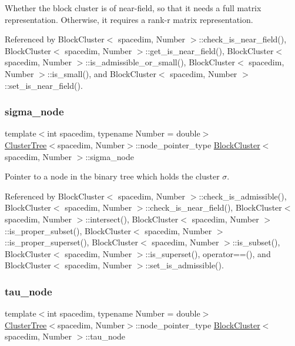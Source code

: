 Whether the block cluster is of near-\/field, so that it needs a full matrix representation. Otherwise, it requires a rank-\/r matrix representation. 

Referenced by Block\+Cluster$<$ spacedim, Number $>$\+::check\+\_\+is\+\_\+near\+\_\+field(), Block\+Cluster$<$ spacedim, Number $>$\+::get\+\_\+is\+\_\+near\+\_\+field(), Block\+Cluster$<$ spacedim, Number $>$\+::is\+\_\+admissible\+\_\+or\+\_\+small(), Block\+Cluster$<$ spacedim, Number $>$\+::is\+\_\+small(), and Block\+Cluster$<$ spacedim, Number $>$\+::set\+\_\+is\+\_\+near\+\_\+field().

\mbox{\label{classBlockCluster_ae1005ec7feedbdb990b27d845b24bad2}} 
\subsubsection{\texorpdfstring{sigma\+\_\+node}{sigma\_node}}
{\footnotesize\ttfamily template$<$int spacedim, typename Number = double$>$ \\
\hyperlink{classClusterTree}{Cluster\+Tree}$<$spacedim, Number$>$\+::node\+\_\+pointer\+\_\+type \hyperlink{classBlockCluster}{Block\+Cluster}$<$ spacedim, Number $>$\+::sigma\+\_\+node\hspace{0.3cm}{\ttfamily [private]}}

Pointer to a node in the binary tree which holds the cluster $\sigma$. 

Referenced by Block\+Cluster$<$ spacedim, Number $>$\+::check\+\_\+is\+\_\+admissible(), Block\+Cluster$<$ spacedim, Number $>$\+::check\+\_\+is\+\_\+near\+\_\+field(), Block\+Cluster$<$ spacedim, Number $>$\+::intersect(), Block\+Cluster$<$ spacedim, Number $>$\+::is\+\_\+proper\+\_\+subset(), Block\+Cluster$<$ spacedim, Number $>$\+::is\+\_\+proper\+\_\+superset(), Block\+Cluster$<$ spacedim, Number $>$\+::is\+\_\+subset(), Block\+Cluster$<$ spacedim, Number $>$\+::is\+\_\+superset(), operator==(), and Block\+Cluster$<$ spacedim, Number $>$\+::set\+\_\+is\+\_\+admissible().

\mbox{\label{classBlockCluster_aac88834478cb4e409596e58100a5e9de}} 
\subsubsection{\texorpdfstring{tau\+\_\+node}{tau\_node}}
{\footnotesize\ttfamily template$<$int spacedim, typename Number = double$>$ \\
\hyperlink{classClusterTree}{Cluster\+Tree}$<$spacedim, Number$>$\+::node\+\_\+pointer\+\_\+type \hyperlink{classBlockCluster}{Block\+Cluster}$<$ spacedim, Number $>$\+::tau\+\_\+node\hspace{0.3cm}{\ttfamily [private]}}

